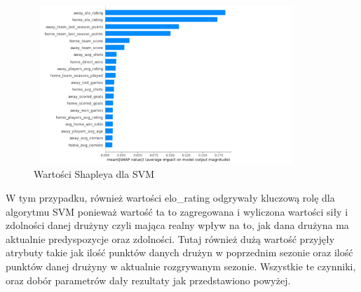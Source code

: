 \begin{figure}[H] 
        \centering\includegraphics[width=10cm,height=6cm]{figures/ShapSVM.png}
        \caption{Wartości Shapleya dla SVM}\label{Shap-SVM}
\end{figure}
W tym przypadku, również wartości elo\_rating odgrywały kluczową rolę dla algorytmu SVM ponieważ wartość ta to zagregowana i wyliczona wartości siły i zdolności danej drużyny czyli mająca realny wpływ na to, jak dana drużyna ma aktualnie predyspozycje oraz zdolności. Tutaj również dużą wartość przyjęły atrybuty takie jak ilość punktów danych drużyn w poprzednim sezonie oraz ilość punktów danej drużyny w aktualnie rozgrywanym sezonie. Wszystkie te czynniki, oraz dobór parametrów dały rezultaty jak przedstawiono powyżej.
